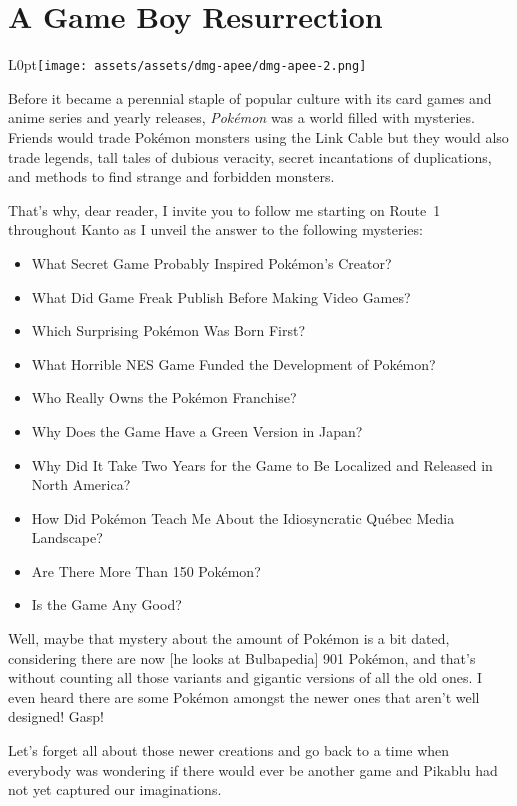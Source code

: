 \documentclass{book}
\begin{document}
\newpage\FloatBarrier\section*{A Game Boy Resurrection}
\begin{wrapfigure}{L}{0pt}{\texttt{[image: assets/assets/dmg-apee/dmg-apee-2.png]}}\end{wrapfigure}\noindent
Before it became a perennial staple of popular culture with its card games and anime series and yearly releases, \emph{Pokémon} was a world filled with mysteries. Friends would trade Pokémon monsters using the Link Cable but they would also trade legends, tall tales of dubious veracity, secret incantations of duplications, and methods to find strange and forbidden monsters.\par
That’s why, dear reader, I invite you to follow me starting on Route~1 throughout Kanto as I unveil the answer to the following mysteries:\par
\begin{itemize}

\item What Secret Game Probably Inspired Pokémon’s Creator?
\item What Did Game Freak Publish Before Making Video Games?
\item Which Surprising Pokémon Was Born First?
\item What Horrible NES Game Funded the Development of Pokémon?
\item Who Really Owns the Pokémon Franchise?
\item Why Does the Game Have a Green Version in Japan?
\item Why Did It Take Two Years for the Game to Be Localized and Released in North America?
\item How Did Pokémon Teach Me About the Idiosyncratic Québec Media Landscape?
\item Are There More Than 150 Pokémon?
\item Is the Game Any Good?

\end{itemize}
Well, maybe that mystery about the amount of Pokémon is a bit dated, considering there are now [he looks at Bulbapedia] 901 Pokémon, and that’s without counting all those variants and gigantic versions of all the old ones. I even heard there are some Pokémon amongst the newer ones that aren’t well designed! Gasp!\par
Let’s forget all about those newer creations and go back to a time when everybody was wondering if there would ever be another game and Pikablu had not yet captured our imaginations.\par
\end{document}
